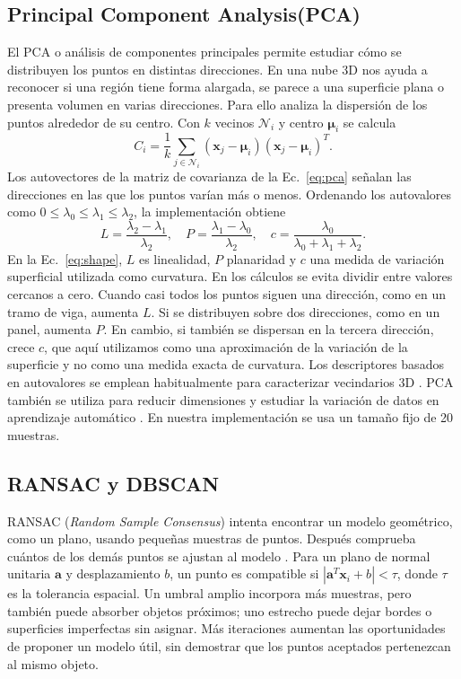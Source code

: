 \documentclass[journal,onecolumn]{IEEEtran}
\begin{document}
\subsection{Principal Component Analysis(PCA)}
El PCA o análisis de componentes principales permite estudiar cómo se distribuyen los puntos en distintas direcciones. En una nube 3D nos ayuda a reconocer si una región tiene forma alargada, se parece a una superficie plana o presenta volumen en varias direcciones. Para ello analiza la dispersión de los puntos alrededor de su centro. Con $k$ vecinos $\mathcal{N}_i$ y centro $\boldsymbol{\mu}_i$ se calcula
\begin{equation}C_i=\frac{1}{k}\sum_{j\in\mathcal{N}_i}(\mathbf{x}_j-\boldsymbol{\mu}_i)(\mathbf{x}_j-\boldsymbol{\mu}_i)^T.\label{eq:pca}\end{equation}
Los autovectores de la matriz de covarianza de la Ec.~\eqref{eq:pca} señalan las direcciones en las que los puntos varían más o menos. Ordenando los autovalores como $0\leq\lambda_0\leq\lambda_1\leq\lambda_2$, la implementación obtiene
\begin{equation}L=\frac{\lambda_2-\lambda_1}{\lambda_2},\quad P=\frac{\lambda_1-\lambda_0}{\lambda_2},\quad c=\frac{\lambda_0}{\lambda_0+\lambda_1+\lambda_2}.\label{eq:shape}\end{equation}
En la Ec.~\eqref{eq:shape}, $L$ es linealidad, $P$ planaridad y $c$ una medida de variación superficial utilizada como curvatura. En los cálculos se evita dividir entre valores cercanos a cero. Cuando casi todos los puntos siguen una dirección, como en un tramo de viga, aumenta $L$. Si se distribuyen sobre dos direcciones, como en un panel, aumenta $P$. En cambio, si también se dispersan en la tercera dirección, crece $c$, que aquí utilizamos como una aproximación de la variación de la superficie y no como una medida exacta de curvatura. Los descriptores basados en autovalores se emplean habitualmente para caracterizar vecindarios 3D \cite{demantke}. PCA también se utiliza para reducir dimensiones y estudiar la variación de datos en aprendizaje automático \cite{bishop,muller}. En nuestra implementación se usa un tamaño fijo de 20 muestras.

\subsection{RANSAC y DBSCAN}

RANSAC (\textit{Random Sample Consensus}) intenta encontrar un modelo geométrico, como un plano, usando pequeñas muestras de puntos. Después comprueba cuántos de los demás puntos se ajustan al modelo \cite{ransac}. Para un plano de normal unitaria $\mathbf{a}$ y desplazamiento $b$, un punto es compatible si $|\mathbf{a}^T\mathbf{x}_i+b|<\tau$, donde $\tau$ es la tolerancia espacial. Un umbral amplio incorpora más muestras, pero también puede absorber objetos próximos; uno estrecho puede dejar bordes o superficies imperfectas sin asignar. Más iteraciones aumentan las oportunidades de proponer un modelo útil, sin demostrar que los puntos aceptados pertenezcan al mismo objeto.
\end{document}
